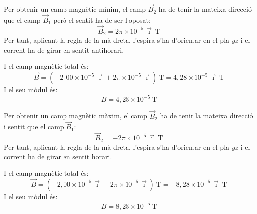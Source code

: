 \begin{solapartat}
 Per obtenir un camp magnètic mínim, el camp $\vec{B}_2$ ha de tenir la mateixa direcció que el camp $\vec{B}_1$ però el sentit ha de ser l'oposat:
\[ \vec{B}_2 = 2\pi\times 10^{-5}\,\vec{\imath}\ \mathrm{T} \]
Per tant, aplicant la regla de la mà dreta, l'espira s'ha d'orientar en el pla $yz$ i el corrent ha de girar en sentit antihorari.

 I el camp magnètic total és:
\[ \vec{B} = \left(-2,00\times 10^{-5}\,\vec{\imath} + 2\pi\times 10^{-5}\,\vec{\imath}\right)\ \mathrm{T} = 4,28\times 10^{-5}\,\vec{\imath}\ \mathrm{T} \]
I el seu mòdul és:
\[ B = 4,28\times 10^{-5}\ \mathrm{T} \]

 Per obtenir un camp magnètic màxim, el camp $\vec{B}_2$ ha de tenir la mateixa direcció i sentit que el camp $\vec{B}_1$:
\[ \vec{B}_2 = -2\pi\times 10^{-5}\,\vec{\imath}\ \mathrm{T} \]
Per tant, aplicant la regla de la mà dreta, l'espira s'ha d'orientar en el pla $yz$ i el corrent ha de girar en sentit horari.

 I el camp magnètic total és:
\[ \vec{B} = \left(-2,00\times 10^{-5}\,\vec{\imath} - 2\pi\times 10^{-5}\,\vec{\imath}\right)\ \mathrm{T} = -8,28\times 10^{-5}\,\vec{\imath}\ \mathrm{T} \]
I el seu mòdul és:
\[ B = 8,28\times 10^{-5}\ \mathrm{T} \]
\end{solapartat}
